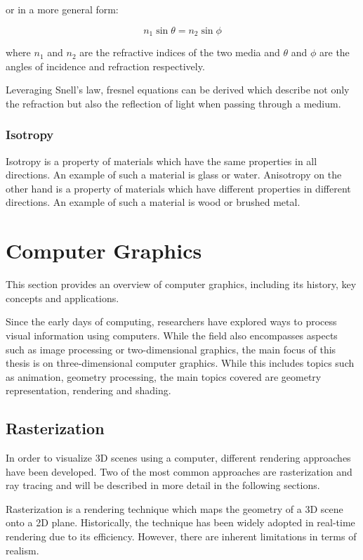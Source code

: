 or in a more general form:

\begin{equation}
  \label{eqn:snells-law-general}
  n_1 \sin \theta = n_2 \sin \phi
\end{equation}

where $n_1$ and $n_2$ are the refractive indices of the two media and $\theta$ and $\phi$ are the angles of incidence and refraction respectively.

Leveraging Snell's law, fresnel equations can be derived which describe not only the refraction but also the reflection of light when passing through a medium.

\subsubsection{Isotropy}

Isotropy is a property of materials which have the same properties in all directions. An example of such a material is glass or water. Anisotropy on the other hand is a property of materials which have different properties in different directions. An example of such a material is wood or brushed metal. 

\section{Computer Graphics}

This section provides an overview of computer graphics, including its history, key concepts and applications.

Since the early days of computing, researchers have explored ways to process visual information using computers. While the field also encompasses aspects such as image processing or two-dimensional graphics, the main focus of this thesis is on three-dimensional computer graphics. While this includes topics such as animation, geometry processing, the main topics covered are geometry representation, rendering and shading.

\subsection{Rasterization}

In order to visualize 3D scenes using a computer, different rendering approaches have been developed. Two of the most common approaches are rasterization and ray tracing and will be described in more detail in the following sections.

Rasterization is a rendering technique which maps the geometry of a 3D scene onto a 2D plane. Historically, the technique has been widely adopted in real-time rendering due to its efficiency. However, there are inherent limitations in terms of realism.

